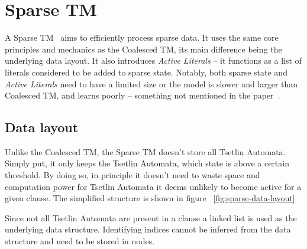 \documentclass[english]{aghengthesis} %
\begin{document}
\section{Sparse TM}
A Sparse TM~\cite{glimsdal2024sparsetsetlinmachine} aims to efficiently process sparse data. It uses the same core principles and mechanics as the Coalesced TM, its main difference being the underlying data layout. It also introduces \textit{Active Literals} -- it functions as a list of literals considered to be added to sparse state. Notably, both sparse state and \textit{Active Literals} need to have a limited size or the model is slower and larger than Coalesced TM, and learns poorly -- something not mentioned in the paper~\cite{glimsdal2024sparsetsetlinmachine}.

\subsection{Data layout}
Unlike the Coalesced TM, the Sparse TM doesn't store all Tsetlin Automata. Simply put, it only keeps the Tsetlin Automata, which state is above a certain threshold. By doing so, in principle it doesn't need to waste space and computation power for Tsetlin Automata it deems unlikely to become active for a given clause. The simplified structure is shown in figure ~\ref{fig:sparse-data-layout}
\par Since not all Tsetlin Automata are present in a clause a linked list is used as the underlying data structure. Identifying indices cannot be inferred from the data structure and need to be stored in nodes.
\end{document}
